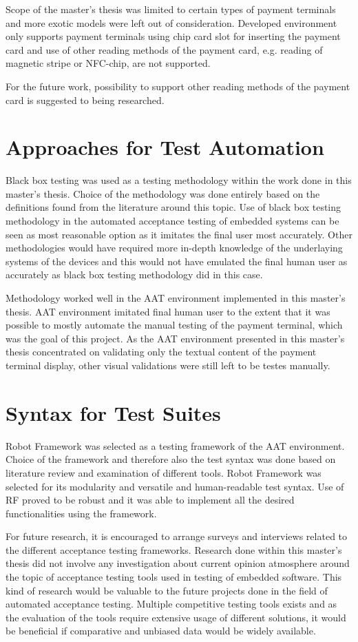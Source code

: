 Scope of the master's thesis was limited to certain types of payment terminals and more exotic models were left out of consideration. Developed environment only supports payment terminals using chip card slot for inserting the payment card and use of other reading methods of the payment card, e.g. reading of magnetic stripe or NFC-chip, are not supported.

For the future work, possibility to support other reading methods of the payment card is suggested to being researched.

\section{Approaches for Test Automation}

Black box testing was used as a testing methodology within the work done in this master's thesis. Choice of the methodology was done entirely based on the definitions found from the literature around this topic. Use of black box testing methodology in the automated acceptance testing of embedded systems can be seen as most reasonable option as it imitates the final user most accurately. Other methodologies would have required more in-depth knowledge of the underlaying systems of the devices and this would not have emulated the final human user as accurately as black box testing methodology did in this case.

Methodology worked well in the AAT environment implemented in this master's thesis. AAT environment imitated final human user to the extent that it was possible to mostly automate the manual testing of the payment terminal, which was the goal of this project. As the AAT environment presented in this master's thesis concentrated on validating only the textual content of the payment terminal display, other visual validations were still left to be testes manually.

\section{Syntax for Test Suites}

Robot Framework was selected as a testing framework of the AAT environment. Choice of the framework and therefore also the test syntax was done based on literature review and examination of different tools. Robot Framework was selected for its modularity and versatile and human-readable test syntax. Use of RF proved to be robust and it was able to implement all the desired functionalities using the framework.

For future research, it is encouraged to arrange surveys and interviews related to the different acceptance testing frameworks. Research done within this master's thesis did not involve any investigation about current opinion atmosphere around the topic of acceptance testing tools used in testing of embedded software. This kind of research would be valuable to the future projects done in the field of automated acceptance testing. Multiple competitive testing tools exists and as the evaluation of the tools require extensive usage of different solutions, it would be beneficial if comparative and unbiased data would be widely available.



